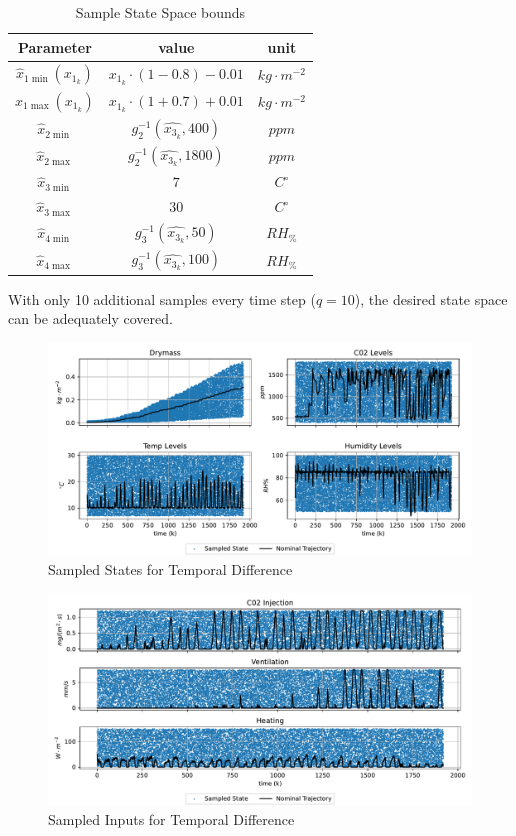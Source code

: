 \begin{table}[H]
    \centering
    \begin{tabular}{|c|c|c|}
    \hline
        Parameter& value& unit\\
        \hline
        $\hat{x}_{1\min}(x_{1_k})$ & $x_{1_k} \cdot (1-0.8) - 0.01 $ & $kg \cdot m^{-2}$\\
        $\hat{x}_{1\max}(x_{1_k})$ &$x_{1_k} \cdot (1+0.7) + 0.01 $ & $kg \cdot m^{-2}$\\
        $\hat{x}_{2\min}$ & $g_2^{-1} (\hat{x_{3_k}},400)$& $ppm$ \\
        $\hat{x}_{2\max}$ & $g_2^{-1} (\hat{x_{3_k}},1800)$& $ppm$ \\
        $\hat{x}_{3\min}$ &$7 $& $C^\circ$ \\
        $\hat{x}_{3\max}$ &$30$ &$C^\circ$\\
        $\hat{x}_{4\min}$ &$g_3^{-1} (\hat{x_{3_k}},50)$& $RH_{\%}$ \\
        $\hat{x}_{4\max}$ &$g_3^{-1} (\hat{x_{3_k}},100)$& $RH_{\%}$ \\
        \hline
    \end{tabular}
    \caption{Sample State Space bounds}
    \label{tab:sample_bounds_td}
\end{table}

With only 10 additional samples every time step ($q=10$), the desired state space can be adequately covered.

\begin{figure}[H]
	\centering
	\includegraphics[width = \textwidth]{figures/sampled_y_td.png}
	\caption{Sampled States for Temporal Difference}
	\label{fig:sampled-states-TD}
\end{figure}
\begin{figure}[H]
	\centering
	\includegraphics[width = \textwidth]{figures/sampled_u_td.png}
	\caption{Sampled Inputs for Temporal Difference}
	\label{fig:sampled-inpts-TD}
\end{figure}


